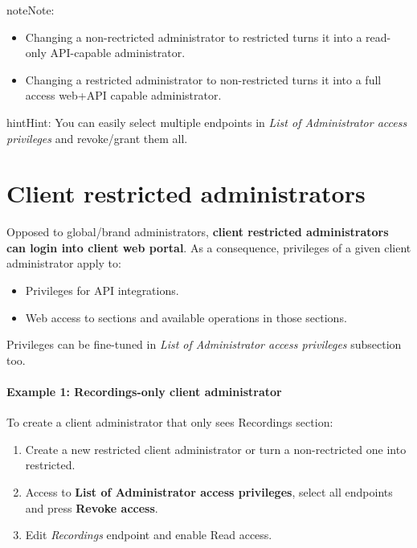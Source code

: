 \documentclass[letterpaper,10pt,english]{sphinxmanual}
\begin{document}
\begin{notice}{note}{Note:}\begin{itemize}
\item {} 
Changing a non-rectricted administrator to restricted turns it into a read-only API-capable administrator.

\item {} 
Changing a restricted administrator to non-restricted turns it into a full access web+API capable administrator.

\end{itemize}
\end{notice}

\begin{notice}{hint}{Hint:}
You can easily select multiple endpoints in \emph{List of Administrator access privileges} and revoke/grant them all.
\end{notice}


\section{Client restricted administrators}
\label{api_rest/acls:client-restricted-administrators}
Opposed to global/brand administrators, \textbf{client restricted administrators can login into client web portal}. As a
consequence, privileges of a given client administrator apply to:
\begin{itemize}
\item {} 
Privileges for API integrations.

\item {} 
Web access to sections and available operations in those sections.

\end{itemize}

Privileges can be fine-tuned in \emph{List of Administrator access privileges} subsection too.
\paragraph{Example 1: Recordings-only client administrator}

To create a client administrator that only sees Recordings section:
\begin{enumerate}
\item {} 
Create a new restricted client administrator or turn a non-rectricted one into restricted.

\item {} 
Access to \textbf{List of Administrator access privileges}, select all endpoints and press \textbf{Revoke access}.

\item {} 
Edit \emph{Recordings} endpoint and enable Read access.

\end{enumerate}
\end{document}

